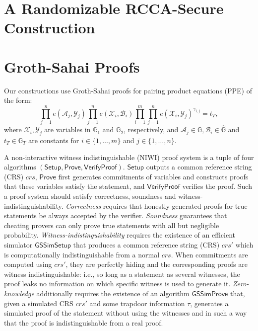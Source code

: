 \documentclass[10pt]{llncs}
\newcommand{\G}{\mathbb{G}}
\begin{document}
\section{A Randomizable RCCA-Secure Construction} \label{RCCA-scheme}









\newpage 

\appendix 



\section{Groth-Sahai Proofs}\label{GS-proofs}

 Our constructions use Groth-Sahai proofs for pairing
product equations (PPE) of the form:
$$\prod_{j=1}^n e(\mathcal{A}_j,\mathcal{Y}_j) \prod_{j=1}^n e(\mathcal{X}_i,\mathcal{B}_i)
\prod_{i=1}^m \prod_{j=1}^n
e(\mathcal{X}_i,\mathcal{Y}_j)^{\gamma_{i,j}} = t_T,$$ where
$\mathcal{X}_i, \mathcal{Y}_j$ are variables in $\G_1$ and $\G_2$,
respectively,
 and $\mathcal{A}_j \in\G,\mathcal{B}_i\in \hat{\G}$ and $t_T\in\G_T$ are constants for $i\in \{1,\ldots,m \}$ and $j\in \{1,\ldots,n \}$.

A non-interactive witness indistinguishable (NIWI) proof system is a tuple of four algorithms
$(\mathsf{Setup},\mathsf{Prove},\mathsf{VerifyProof})$. 
$\mathsf{Setup}$ outputs a common reference string (CRS) $crs$,
$\mathsf{Prove}$ first generates commitments of variables and
constructs proofs that these variables satisfy the statement, and
$\mathsf{VerifyProof}$ verifies the proof. Such a proof system should satisfy correctness,
soundness and witness-indistinguishability. \emph{Correctness}
requires that honestly generated proofs
for  true statements be always accepted by the verifier. \emph{Soundness} guarantees that cheating
provers can only prove true statements with all but negligible probability.
\emph{Witness-indistinguishability} requires the existence of   an efficient
simulator $\mathsf{GSSimSetup}$  that produces a common
reference string (CRS) $crs'$ which is computationally
indistinguishable from a normal $crs$. When commitments are computed
using $crs'$, they are perfectly hiding and the corresponding
proofs are witness indistinguishable:  i.e., so long as a statement as several witnesses, the proof 
 leaks no information on which specific witness is used to generate it.
\emph{Zero-knowledge} additionally requires the existence of an
algorithm $\mathsf{GSSimProve}$ that, given a simulated CRS $crs'$
and some trapdoor information $\tau$, generates a simulated proof of
the statement without using the witnesses and in such a way that the
proof is indistinguishable from a real proof. 
\end{document}
